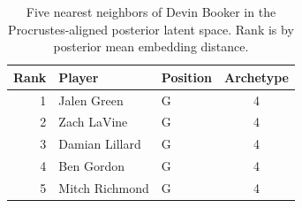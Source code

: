 \begin{table}[htbp]
  \centering\small
  \begin{tabular}{rllc}
    \toprule
    Rank & Player & Position & Archetype \\
    \midrule
    1 & Jalen Green & G & 4 \\
    2 & Zach LaVine & G & 4 \\
    3 & Damian Lillard & G & 4 \\
    4 & Ben Gordon & G & 4 \\
    5 & Mitch Richmond & G & 4 \\
    \bottomrule
  \end{tabular}
  \caption{Five nearest neighbors of Devin Booker in the Procrustes-aligned posterior latent space. Rank is by posterior mean embedding distance.}
  \label{tab:Devin_Booker_neighbors}
\end{table}

